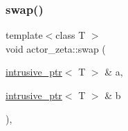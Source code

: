 \subsubsection{\texorpdfstring{swap()}{swap()}}
{\footnotesize\ttfamily template$<$class T $>$ \\
void actor\+\_\+zeta\+::swap (\begin{DoxyParamCaption}\item[{\hyperlink{classactor__zeta_1_1intrusive__ptr}{intrusive\+\_\+ptr}$<$ T $>$ \&}]{a,  }\item[{\hyperlink{classactor__zeta_1_1intrusive__ptr}{intrusive\+\_\+ptr}$<$ T $>$ \&}]{b }\end{DoxyParamCaption})\hspace{0.3cm}{\ttfamily [inline]}, {\ttfamily [noexcept]}}

